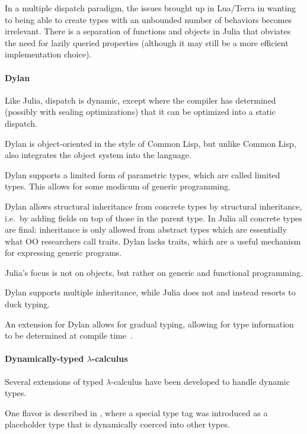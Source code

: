 \documentclass[pldi]{sigplanconf-pldi15}
\begin{document}

In a multiple dispatch paradigm, the issues brought up in Lua/Terra in wanting
to being able to create types with an unbounded number of behaviors becomes
irrelevant. There is a separation of functions and objects in Julia that
obviates the need for lazily queried properties (although it may still be a
more efficient implementation choice).

\paragraph{Dylan}

Like Julia, dispatch is dynamic, except where the compiler has determined
(possibly with sealing optimizations) that it can be optimized into a static
dispatch.

Dylan is object-oriented in the style of Common Lisp, but unlike Common Lisp,
also integrates the object system into the language.

Dylan supports a limited form of parametric types, which are called limited
types.\cite{dylanman} This allows for some modicum of generic programming.

Dylan allows structural inheritance from concrete types by structural
inheritance, i.e.\ by adding fields on top of those in the parent type. In
Julia all concrete types are final: inheritance is only allowed from abstract
types which are essentially what OO researchers call traits. Dylan lacks
traits, which are a useful mechanism for expressing generic programs.

Julia's focus is not on objects, but rather on generic and functional
programming.

Dylan supports multiple inheritance, while Julia does not and instead resorts
to duck typing.

An extension for Dylan allows for gradual typing, allowing for type information
to be determined at compile time~\cite{Mehnert2010}.

\paragraph{Dynamically-typed $\lambda$-calculus}

Several extensions of typed $\lambda$-calculus have been developed to handle
dynamic types.

One flavor is described in \cite{Henglein1994}, where a special type tag
 was introduced as a placeholder type that is dynamically coerced
into other types. %
\end{document}
